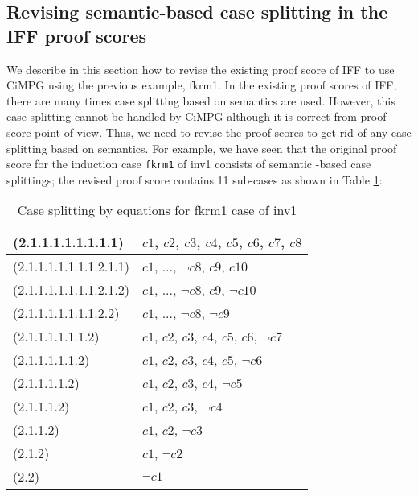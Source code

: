 \documentclass[a4paper,fleqn]{cas-dc}
\begin{document}
\subsection{Revising semantic-based case splitting in the IFF proof scores} \label{semantic}
We describe in this section how to revise the existing proof score of IFF to use CiMPG using the previous example, fkrm1. In the existing proof scores of IFF, there are many times case splitting based on semantics are used. However, this case splitting cannot be handled by CiMPG although it is correct from proof score point of view. Thus, we need to revise the proof scores to get rid of any case splitting based on semantics. For example, we have seen that the original proof score for the induction case  \verb!fkrm1!  of inv1 consists of semantic -based case splittings; the revised proof score contains 11 sub-cases as shown in Table \ref{fig-cs-inv1iff}:
\noindent
\begin{table}[]
	\begin{tabular}{l|l}
		\hline
		(2.1.1.1.1.1.1.1.1)           & $c1$, $c2$, $c3$, $c4$, $c5$, $c6$, $c7$, $c8$                                                    \\ \hline
		(2.1.1.1.1.1.1.1.2.1.1)         & $c1$, ..., $\neg c8$, $c9$, $c10$                                                       \\ \hline
		(2.1.1.1.1.1.1.1.2.1.2)         & $c1$, ..., $\neg c8$, $c9$, $\neg c10$                                                       \\ \hline
		(2.1.1.1.1.1.1.1.2.2) & $c1$, ..., $\neg c8$, $\neg c9$
		\\ \hline
		(2.1.1.1.1.1.1.2) & $c1$, $c2$, $c3$, $c4$, $c5$, $c6$, $\neg c7$ \\ \hline
		(2.1.1.1.1.1.2)   & $c1$, $c2$, $c3$, $c4$, $c5$, $\neg c6$              \\ \hline
		(2.1.1.1.1.2)     & $c1$, $c2$, $c3$, $c4$, $\neg c5$                           \\ \hline
		(2.1.1.1.2)       & $c1$, $c2$, $c3$, $\neg c4$                                        \\ \hline
		(2.1.1.2)       & $c1$, $c2$, $\neg c3$                                        \\ \hline
		
	    (2.1.2)       & $c1$, $\neg c2$                                        \\ \hline
	    (2.2)       & $\neg c1$                                        \\ \hline
	\end{tabular}
\caption{Case splitting by equations for fkrm1 case of inv1}
\label{fig-cs-inv1iff}
\end{table}
\end{document}
